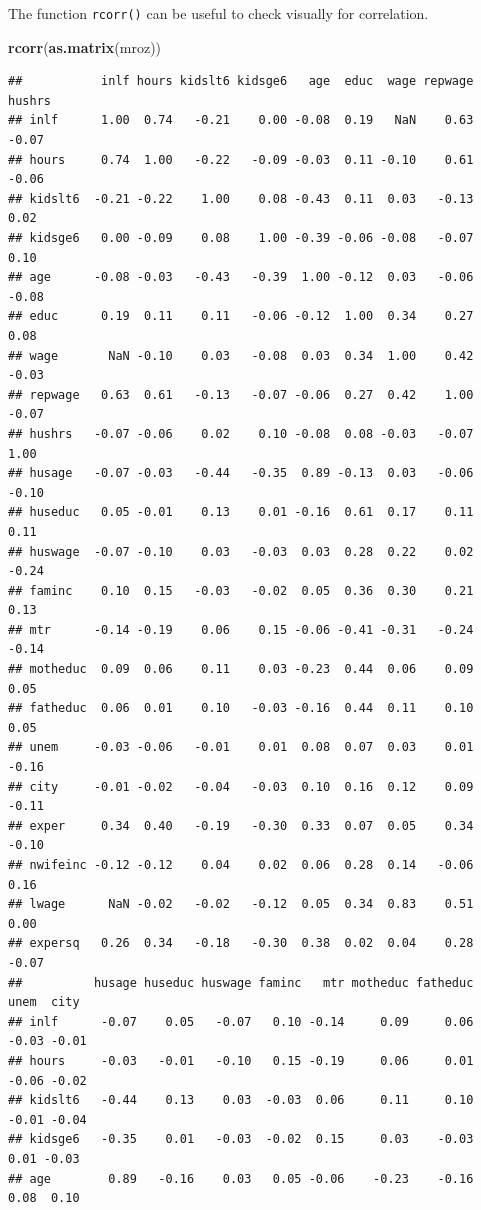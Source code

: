 \documentclass[]{book}
\newenvironment{Shaded}{\begin{snugshade}}{\end{snugshade}}
\newcommand{\KeywordTok}[1]{\textcolor[rgb]{0.13,0.29,0.53}{\textbf{#1}}}
\newcommand{\NormalTok}[1]{#1}
\begin{document}
The function \texttt{rcorr()} can be useful to check visually for correlation.

\begin{Shaded}
\begin{Highlighting}[]
\KeywordTok{rcorr}\NormalTok{(}\KeywordTok{as.matrix}\NormalTok{(mroz))}
\end{Highlighting}
\end{Shaded}

\begin{verbatim}
##           inlf hours kidslt6 kidsge6   age  educ  wage repwage hushrs
## inlf      1.00  0.74   -0.21    0.00 -0.08  0.19   NaN    0.63  -0.07
## hours     0.74  1.00   -0.22   -0.09 -0.03  0.11 -0.10    0.61  -0.06
## kidslt6  -0.21 -0.22    1.00    0.08 -0.43  0.11  0.03   -0.13   0.02
## kidsge6   0.00 -0.09    0.08    1.00 -0.39 -0.06 -0.08   -0.07   0.10
## age      -0.08 -0.03   -0.43   -0.39  1.00 -0.12  0.03   -0.06  -0.08
## educ      0.19  0.11    0.11   -0.06 -0.12  1.00  0.34    0.27   0.08
## wage       NaN -0.10    0.03   -0.08  0.03  0.34  1.00    0.42  -0.03
## repwage   0.63  0.61   -0.13   -0.07 -0.06  0.27  0.42    1.00  -0.07
## hushrs   -0.07 -0.06    0.02    0.10 -0.08  0.08 -0.03   -0.07   1.00
## husage   -0.07 -0.03   -0.44   -0.35  0.89 -0.13  0.03   -0.06  -0.10
## huseduc   0.05 -0.01    0.13    0.01 -0.16  0.61  0.17    0.11   0.11
## huswage  -0.07 -0.10    0.03   -0.03  0.03  0.28  0.22    0.02  -0.24
## faminc    0.10  0.15   -0.03   -0.02  0.05  0.36  0.30    0.21   0.13
## mtr      -0.14 -0.19    0.06    0.15 -0.06 -0.41 -0.31   -0.24  -0.14
## motheduc  0.09  0.06    0.11    0.03 -0.23  0.44  0.06    0.09   0.05
## fatheduc  0.06  0.01    0.10   -0.03 -0.16  0.44  0.11    0.10   0.05
## unem     -0.03 -0.06   -0.01    0.01  0.08  0.07  0.03    0.01  -0.16
## city     -0.01 -0.02   -0.04   -0.03  0.10  0.16  0.12    0.09  -0.11
## exper     0.34  0.40   -0.19   -0.30  0.33  0.07  0.05    0.34  -0.10
## nwifeinc -0.12 -0.12    0.04    0.02  0.06  0.28  0.14   -0.06   0.16
## lwage      NaN -0.02   -0.02   -0.12  0.05  0.34  0.83    0.51   0.00
## expersq   0.26  0.34   -0.18   -0.30  0.38  0.02  0.04    0.28  -0.07
##          husage huseduc huswage faminc   mtr motheduc fatheduc  unem  city
## inlf      -0.07    0.05   -0.07   0.10 -0.14     0.09     0.06 -0.03 -0.01
## hours     -0.03   -0.01   -0.10   0.15 -0.19     0.06     0.01 -0.06 -0.02
## kidslt6   -0.44    0.13    0.03  -0.03  0.06     0.11     0.10 -0.01 -0.04
## kidsge6   -0.35    0.01   -0.03  -0.02  0.15     0.03    -0.03  0.01 -0.03
## age        0.89   -0.16    0.03   0.05 -0.06    -0.23    -0.16  0.08  0.10

\end{verbatim}
\end{document}
